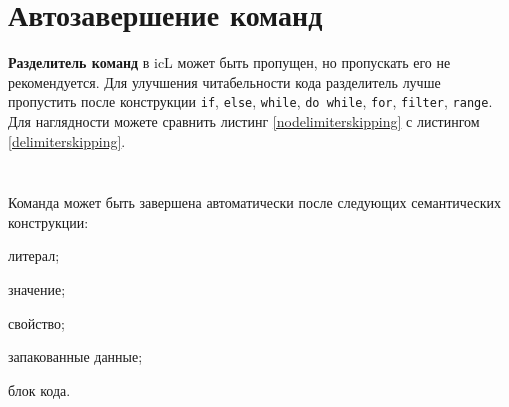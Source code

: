 \section{Автозавершение команд}

\textbf{Разделитель команд} в icL может быть пропущен, но пропускать его не рекомендуется. Для улучшения читабельности кода разделитель лучше пропустить после конструкции \texttt{if}, \texttt{else}, \texttt{while}, \texttt{do while}, \texttt{for}, \texttt{filter}, \texttt{range}. Для наглядности можете сравнить листинг \ref{nodelimiterskipping} с листингом \ref{delimiterskipping}.

\begin{sourcecode}
	\label{nodelimiterskipping}
    \inputminted[linenos]{icl}{../sources/nodelimiterskipping.icL}
\end{sourcecode}

\begin{sourcecode}
	\label{delimiterskipping}
    \inputminted[linenos]{icl}{../sources/delimiterskipping.icL}
\end{sourcecode}

Команда может быть завершена автоматически после следующих семантических конструкции:
\begin{icItems}
	\item литерал;
	\item значение;
	\item свойство;
	\item запакованные данные;
	\item блок кода.
\end{icItems}